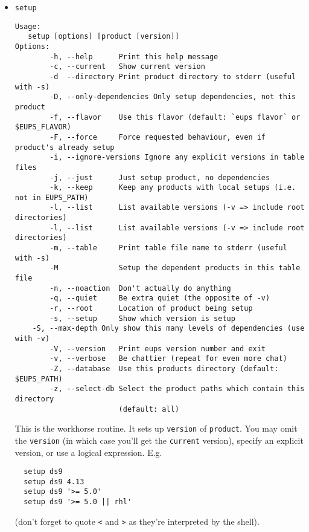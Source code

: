 \documentclass{article}
\newcommand{\code}[1]{\texttt{#1}}
\newcommand{\eups}{\code{ExtUPS}}
\begin{document}
\begin{itemize}
Go through the \eups{} databases and return every product that depends upon
the specified product and version;  if the version's omitted then everything
that depends on product is returned, along with the version required. \textit{N.b.
  this is quite slow --- it needs to read every table file that \eups{} knows about.}

Unless you specify \code{--quiet} you'll be warned if a product depends on
more than one version;  this may sound unlikely but can happen if you setup
the something more than once when setting up a product.


\item \code{setup}
\begin{verbatim}
Usage:
   setup [options] [product [version]]
Options:
        -h, --help      Print this help message
        -c, --current   Show current version
        -d  --directory Print product directory to stderr (useful with -s)
        -D, --only-dependencies Only setup dependencies, not this product	
        -f, --flavor    Use this flavor (default: `eups flavor` or $EUPS_FLAVOR)
        -F, --force     Force requested behaviour, even if product's already setup
        -i, --ignore-versions Ignore any explicit versions in table files
        -j, --just      Just setup product, no dependencies
        -k, --keep      Keep any products with local setups (i.e. not in EUPS_PATH)
        -l, --list      List available versions (-v => include root directories)
        -l, --list      List available versions (-v => include root directories)
        -m, --table     Print table file name to stderr (useful with -s)
        -M              Setup the dependent products in this table file
        -n, --noaction  Don't actually do anything
        -q, --quiet     Be extra quiet (the opposite of -v)
        -r, --root      Location of product being setup
        -s, --setup     Show which version is setup
	-S, --max-depth Only show this many levels of dependencies (use with -v)
        -V, --version   Print eups version number and exit
        -v, --verbose   Be chattier (repeat for even more chat)
        -Z, --database  Use this products directory (default: $EUPS_PATH)
        -z, --select-db Select the product paths which contain this directory 
                        (default: all)
\end{verbatim}				%

This is the workhorse routine. It sets up \code{version} of \code{product}. You
may omit the \code{version} (in which case you'll get the \code{current} version),
specify an explicit version, or use a logical expression. E.g.
\begin{verbatim}
  setup ds9
  setup ds9 4.13
  setup ds9 '>= 5.0'
  setup ds9 '>= 5.0 || rhl'
\end{verbatim}
(don't forget to quote \code{<} and \code{>} as they're interpreted by the shell).


\end{itemize}
\end{document}

